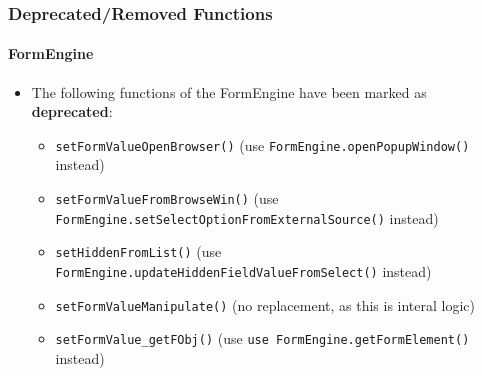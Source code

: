 \begin{frame}[fragile]
	\frametitle{Deprecated/Removed Functions}
	\framesubtitle{FormEngine}

	\lstset{basicstyle=\tiny\ttfamily}

	\begin{itemize}
		\item The following functions of the FormEngine have been marked as \textbf{deprecated}:

			\begin{itemize}
				\item \texttt{setFormValueOpenBrowser()}\newline
					\smaller(use \texttt{FormEngine.openPopupWindow()} instead)\small

				\item \texttt{setFormValueFromBrowseWin()}\newline
					\smaller(use \texttt{FormEngine.setSelectOptionFromExternalSource()} instead)\small

				\item \texttt{setHiddenFromList()}\newline
					\smaller(use \texttt{FormEngine.updateHiddenFieldValueFromSelect()} instead)\small

				\item \texttt{setFormValueManipulate()}\newline
					\smaller(no replacement, as this is interal logic)\small

				\item \texttt{setFormValue\_getFObj()}\newline
					\smaller(use \texttt{use FormEngine.getFormElement()} instead)\small

			\end{itemize}

	\end{itemize}

\end{frame}


